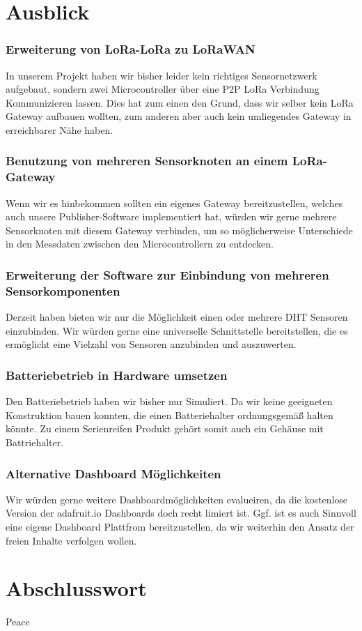 \section{Ausblick} \label{Ausblick}

\subsubsection{Erweiterung von LoRa-LoRa zu LoRaWAN}
In unserem Projekt haben wir bisher leider kein richtiges Sensornetzwerk aufgebaut, sondern zwei Microcontroller über eine P2P LoRa Verbindung Kommunizieren lassen. Dies hat zum einen den Grund, dass wir selber kein LoRa Gateway aufbauen wollten, zum anderen aber auch kein umliegendes Gateway in erreichbarer Nähe haben.

\subsubsection{Benutzung von mehreren Sensorknoten an einem LoRa-Gateway}
Wenn wir es hinbekommen sollten ein eigenes Gateway bereitzustellen, welches auch unsere Publisher-Software implementiert hat, würden wir gerne mehrere Sensorknoten mit diesem Gateway verbinden, um so möglicherweise Unterschiede in den Messdaten zwischen den Microcontrollern zu entdecken.

\subsubsection{Erweiterung der Software zur Einbindung von mehreren Sensorkomponenten}
Derzeit haben bieten wir nur die Möglichkeit einen oder mehrere DHT Sensoren einzubinden. Wir würden gerne eine universelle Schnittstelle bereitstellen, die es ermöglicht eine Vielzahl von Sensoren anzubinden und auszuwerten.

\subsubsection{Batteriebetrieb in Hardware umsetzen}
Den Batteriebetrieb haben wir bisher nur Simuliert. Da wir keine geeigneten Konstruktion bauen konnten, die einen Batteriehalter ordnungsgemäß halten könnte. Zu einem Serienreifen Produkt gehört somit auch ein Gehäuse mit Battriehalter.

\subsubsection{Alternative Dashboard Möglichkeiten}
Wir würden gerne weitere Dashboardmöglichkeiten evalueiren, da die kostenlose Version der adafruit.io Dashboards doch recht limiert ist. Ggf. ist es auch Sinnvoll eine eigene Dashboard Plattfrom bereitzustellen, da wir weiterhin den Ansatz der freien Inhalte verfolgen wollen.

\section{Abschlusswort} \label{Abschlusswort}

Peace

